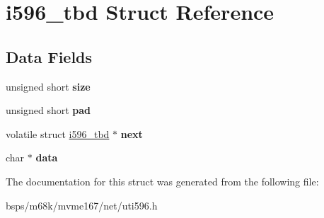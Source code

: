 \hypertarget{structi596__tbd}{}\section{i596\+\_\+tbd Struct Reference}
\label{structi596__tbd}
\subsection*{Data Fields}
\begin{DoxyCompactItemize}
\item 
\mbox{\label{structi596__tbd_ada96d0dfa2e13ca8434c8aac796c679b}} 
unsigned short {\bfseries size}
\item 
\mbox{\label{structi596__tbd_a39005e90c70f4b3abc73140a9be5c9da}} 
unsigned short {\bfseries pad}
\item 
\mbox{\label{structi596__tbd_a455af8422d4196f775bf7e129e998d37}} 
volatile struct \mbox{\hyperlink{structi596__tbd}{i596\+\_\+tbd}} $\ast$ {\bfseries next}
\item 
\mbox{\label{structi596__tbd_a252c13d4f5702c7dcab2fdb4ebd70f18}} 
char $\ast$ {\bfseries data}
\end{DoxyCompactItemize}


The documentation for this struct was generated from the following file\+:\begin{DoxyCompactItemize}
\item 
bsps/m68k/mvme167/net/uti596.\+h\end{DoxyCompactItemize}

